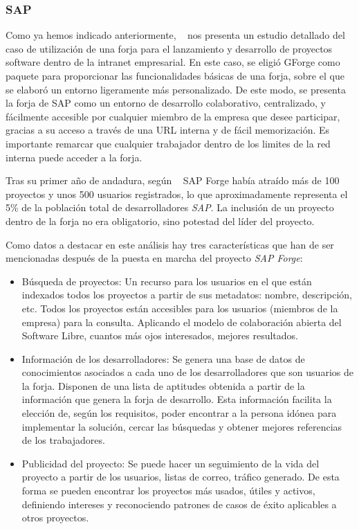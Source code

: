 \subsubsection{SAP}
\label{subsub:sap}

\par Como ya hemos indicado anteriormente, ~\cite{open-collaboration-forges} nos presenta un estudio detallado del caso de utilización de una forja para el lanzamiento y desarrollo de proyectos software dentro de la intranet empresarial. En este caso, se eligió GForge como paquete para proporcionar las funcionalidades básicas de una forja, sobre el que se elaboró un entorno ligeramente más personalizado. De este modo, se presenta la forja de SAP como un entorno de desarrollo colaborativo, centralizado, y fácilmente accesible por cualquier miembro de la empresa que desee participar, gracias a su acceso a través de una URL interna y de fácil memorización. Es importante remarcar que cualquier trabajador dentro de los limites de la red interna puede acceder a la forja.

\par Tras su primer año de andadura, según ~\cite{open-collaboration-forges} SAP Forge había atraído más de 100 proyectos y unos 500 usuarios registrados, lo que aproximadamente representa el 5\% de la población total de desarrolladores \emph{SAP}. La inclusión de un proyecto dentro de la forja no era obligatorio, sino potestad del líder del proyecto.

\par Como datos a destacar en este análisis hay tres características que han de ser mencionadas después de la puesta en marcha del proyecto \emph{SAP Forge}:

\begin{itemize}
	\item Búsqueda de proyectos: Un recurso para los usuarios en el que están indexados todos los proyectos a partir de sus metadatos: nombre, descripción, etc. Todos los proyectos están accesibles para los usuarios (miembros de la empresa) para la consulta. Aplicando el modelo de colaboración abierta del Software Libre, cuantos más ojos interesados, mejores resultados.
	
	\item Información de los desarrolladores: Se genera una base de datos de conocimientos asociados a cada uno de los desarrolladores que son usuarios de la forja. Disponen de una lista de aptitudes obtenida a partir de la información que genera la forja de desarrollo. Esta información facilita la elección de, según los requisitos, poder encontrar a la persona idónea para implementar la solución, cercar las búsquedas y obtener mejores referencias de los trabajadores.
	
	\item Publicidad del proyecto: Se puede hacer un seguimiento de la vida del proyecto a partir de los usuarios, listas de correo, tráfico generado. De esta forma se pueden encontrar los proyectos más usados, útiles y activos, definiendo intereses y reconociendo patrones de casos de éxito aplicables a otros proyectos.
	
\end{itemize}

